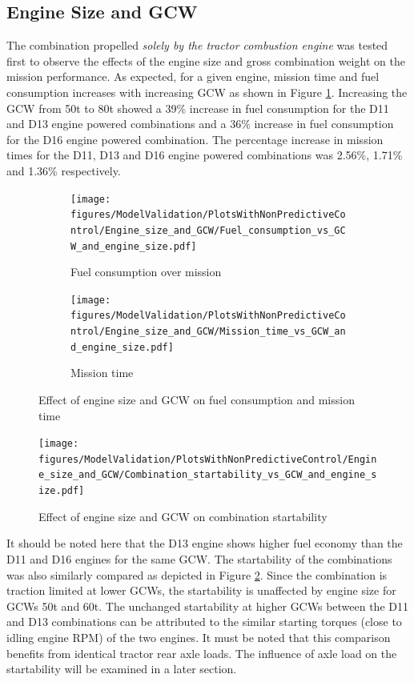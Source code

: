 \documentclass[ExampleMasters.tex]{subfiles}
\begin{document}
\subsection{Engine Size and GCW}
The combination propelled \textit{solely by the tractor combustion engine} was tested first to observe the effects of the engine size and gross combination weight on the mission performance. As expected, for a given engine, mission time and fuel consumption increases with increasing GCW as shown in Figure \ref{timeFuelGCWEngine}. Increasing the GCW from 50t to 80t showed a 39\% increase in fuel consumption for the D11 and D13 engine powered combinations and a 36\% increase in fuel consumption for the D16 engine powered combination. The percentage increase in mission times for the D11, D13 and D16 engine powered combinations was 2.56\%, 1.71\% and 1.36\% respectively.\\
\begin{figure}[h!]
\begin{subfigure}{.5\textwidth}
\centering
\texttt{[image: figures/ModelValidation/PlotsWithNonPredictiveControl/Engine\_size\_and\_GCW/Fuel\_consumption\_vs\_GCW\_and\_engine\_size.pdf]}
\caption{Fuel consumption over mission}
\end{subfigure}
\begin{subfigure}{.5\textwidth}
\centering
\texttt{[image: figures/ModelValidation/PlotsWithNonPredictiveControl/Engine\_size\_and\_GCW/Mission\_time\_vs\_GCW\_and\_engine\_size.pdf]}
\caption{Mission time}
\end{subfigure}
\caption{Effect of engine size and GCW on fuel consumption and mission time}
\label{timeFuelGCWEngine}
\end{figure}
\begin{figure}[h!]
\centering
\texttt{[image: figures/ModelValidation/PlotsWithNonPredictiveControl/Engine\_size\_and\_GCW/Combination\_startability\_vs\_GCW\_and\_engine\_size.pdf]}
\caption{Effect of engine size and GCW on combination startability}
\label{startabilityEngineGCW}
\end{figure}
It should be noted here that the D13 engine shows higher fuel economy than the D11 and D16 engines for the same GCW. The startability of the combinations was also similarly compared as depicted in Figure \ref{startabilityEngineGCW}. Since the combination is traction limited at lower GCWs, the startability is unaffected by engine size for GCWs 50t and 60t. The unchanged startability at higher GCWs between the D11 and D13 combinations can be attributed to the similar starting torques (close to idling engine RPM) of the two engines. It must be noted that this comparison benefits from identical tractor rear axle loads. The influence of axle load on the startability will be examined in a later section.\\
\end{document}
